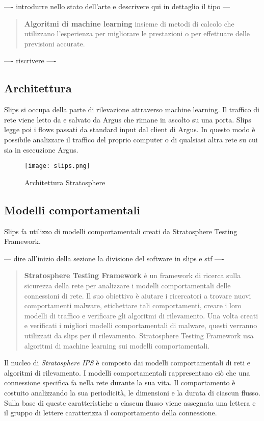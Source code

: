 \documentclass[../main.tex]{subfiles}
\begin{document}
---- introdurre nello stato dell'arte e descrivere qui in dettaglio il tipo ---
\begin{verse}
\textbf{Algoritmi di machine learning}
insieme di metodi di calcolo che utilizzano l'esperienza per migliorare le prestazioni o per effettuare delle previsioni accurate.
\end{verse}

---- riscrivere ----
\subsection{Architettura}
Slips si occupa della parte di rilevazione attraverso machine learning. Il traffico di rete viene letto da e salvato da Argus che rimane in ascolto su una porta. Slips legge poi i flows passati da standard input dal client di Argus. 
In questo modo è possibile analizzare il traffico del proprio computer o di qualsiasi altra rete su cui sia in esecuzione Argus.

\begin{figure}[H]
\centering
\texttt{[image: slips.png]}
\caption{Architettura Stratosphere}
\end{figure}

\subsection{Modelli comportamentali}
Slips fa utilizzo di modelli comportamentali creati da Stratosphere Testing Framework.

--- dire all'inizio della sezione la divisione del software in slips e stf ----
\begin{verse}
\textbf{Stratosphere Testing Framework}
è un framework di ricerca sulla sicurezza della rete per analizzare i modelli comportamentali delle connessioni di rete. Il suo obiettivo è aiutare i ricercatori a trovare nuovi comportamenti malware, etichettare tali comportamenti, creare i loro modelli di traffico e verificare gli algoritmi di rilevamento. Una volta creati e verificati i migliori modelli comportamentali di malware, questi verranno utilizzati da slips per il rilevamento. Stratosphere Testing Framework usa algoritmi di machine learning sui modelli comportamentali.
\end{verse}

Il nucleo di \textit{Stratosphere IPS} è composto dai modelli comportamentali di reti e algoritmi di rilevamento. I modelli comportamentali rappresentano ciò che una connessione specifica fa nella rete durante la sua vita. Il comportamento è costuito analizzando la sua periodicità, le dimensioni e la durata di ciascun flusso. Sulla base di queste caratteristiche a ciascun flusso viene assegnata una lettera e il gruppo di lettere caratterizza il comportamento della connessione.
\end{document}
